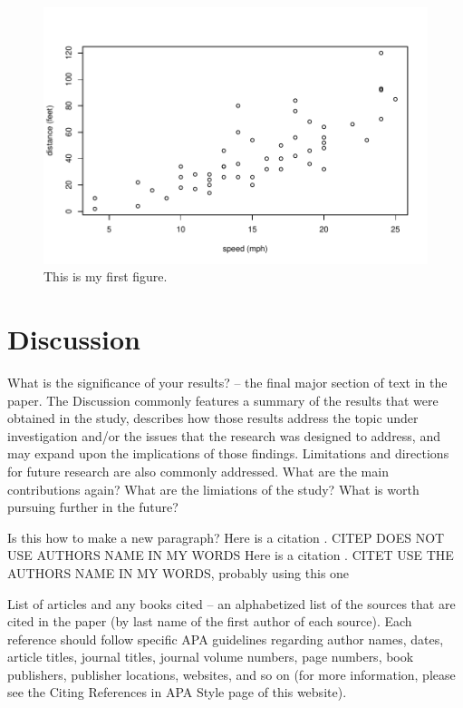 \documentclass[12pt]{article}
\begin{document}
\begin{figure}[H]
  \centering
  \includegraphics[width=\textwidth]{cars.pdf}
  \caption{This is my first figure.}
  \label{fig:cars}
\end{figure}



\section*{Discussion}
What is the significance of your results? – the final major section of text in the paper.  The Discussion commonly features a summary of the results that were obtained in the study, describes how those results address the topic under investigation and/or the issues that the research was designed to address, and may expand upon the implications of those findings.  Limitations and directions for future research are also commonly addressed.
What are the main contributions again?
What are the limiations of the study?
What is worth pursuing further in the future?

  Is this how to make a new paragraph?
Here is a citation \citep{Babu}. CITEP DOES NOT USE AUTHORS NAME IN MY WORDS
Here is a citation \citet{Baramidze}. CITET USE THE AUTHORS NAME IN MY WORDS, probably using this one




List of articles and any books cited – an alphabetized list of the sources that are cited in the paper (by last name of the first author of each source).  Each reference should follow specific APA guidelines regarding author names, dates, article titles, journal titles, journal volume numbers, page numbers, book publishers, publisher locations, websites, and so on (for more information, please see the Citing References in APA Style page of this website).
\end{document}
